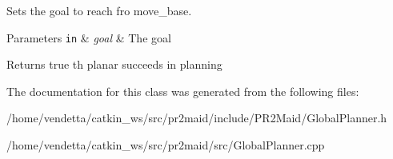Sets the goal to reach fro move\+\_\+base. 


\begin{DoxyParams}[1]{Parameters}
\mbox{\tt in}  & {\em goal} & The goal\\
\hline
\end{DoxyParams}
\begin{DoxyReturn}{Returns}
true th planar succeeds in planning 
\end{DoxyReturn}


The documentation for this class was generated from the following files\+:\begin{DoxyCompactItemize}
\item 
/home/vendetta/catkin\+\_\+ws/src/pr2maid/include/\+P\+R2\+Maid/Global\+Planner.\+h\item 
/home/vendetta/catkin\+\_\+ws/src/pr2maid/src/Global\+Planner.\+cpp\end{DoxyCompactItemize}
